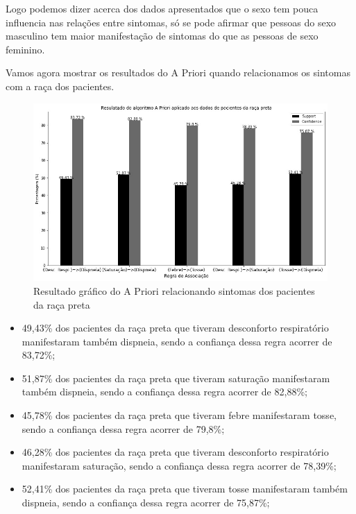 \documentclass[tcc1]{uftex}
\begin{document}
      Logo podemos dizer acerca dos dados apresentados que o sexo tem pouca influencia nas relações entre sintomas, só se pode afirmar que pessoas do sexo masculino tem maior manifestação de sintomas do que as pessoas de sexo feminino. 
      
      Vamos agora mostrar os resultados do A Priori quando relacionamos os sintomas com a raça dos pacientes.
    
    \begin{figure}[!h]
    \centering
    \includegraphics[width=14cm]{1_Preta_apriori.jpg}
    \caption{Resultado gráfico do A Priori relacionando sintomas dos pacientes da raça preta}
    \end{figure}
    
    \begin{itemize}
    \item 49,43\% dos pacientes da raça preta que tiveram desconforto respiratório manifestaram também dispneia, sendo a confiança dessa regra acorrer de 83,72\%;
    
    \item 51,87\% dos pacientes da raça preta que tiveram saturação manifestaram também dispneia, sendo a confiança dessa regra acorrer de 82,88\%;
    
    \item 45,78\% dos pacientes da raça preta que tiveram febre manifestaram tosse, sendo a confiança dessa regra acorrer de 79,8\%;
    
    \item 46,28\% dos pacientes da raça preta que tiveram desconforto respiratório manifestaram saturação, sendo a confiança dessa regra acorrer de 78,39\%;
    
    \item 52,41\% dos pacientes da raça preta que tiveram tosse manifestaram também dispneia, sendo a confiança dessa regra acorrer de 75,87\%;
    \end{itemize}
    
\end{document}
